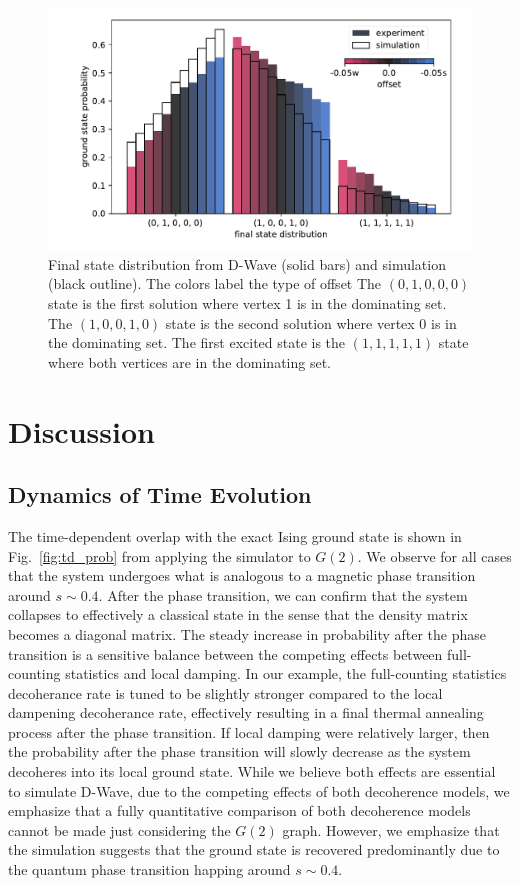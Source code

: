 \documentclass[10pt]{iopart}
\begin{document}
\begin{figure}
	\centering
	\includegraphics[width=\columnwidth]{./new_figures/final_state_distribution.pdf}
	\caption{Final state distribution from D-Wave (solid bars) and simulation (black outline). The colors label the type of offset  The $(0, 1, 0, 0, 0)$ state is the first solution where vertex 1 is in the dominating set. The $(1, 0, 0, 1, 0)$ state is the second solution where vertex 0 is in the dominating set. The first excited state is the $(1, 1, 1, 1, 1)$ state where both vertices are in the dominating set.}
	\label{fig:final_state_distribution}
\end{figure}


\section{Discussion}
\subsection{Dynamics of Time Evolution}
\label{sec:discussion:time_evolution}

The time-dependent overlap with the exact Ising ground state is shown in Fig.~\ref{fig:td_prob} from applying the simulator to $G(2)$. We observe for all cases that the system undergoes what is analogous to a magnetic phase transition around $s\sim 0.4$.
After the phase transition, we can confirm that the system collapses to effectively a classical state in the sense that the density matrix becomes a diagonal matrix.
The steady increase in probability after the phase transition is a sensitive balance between the competing effects between full-counting statistics and local damping.
In our example, the full-counting statistics decoherance rate is tuned to be slightly stronger compared to the local dampening decoherance rate, effectively resulting in a final thermal annealing process after the phase transition.
If local damping were relatively larger, then the probability after the phase transition will slowly decrease as the system decoheres into its local ground state.
While we believe both effects are essential to simulate D-Wave, due to the competing effects of both decoherence models, we emphasize that a fully quantitative comparison of both decoherence models cannot be made just considering the $G(2)$ graph.
However, we emphasize that the simulation suggests that the ground state is recovered predominantly due to the quantum phase transition happing around $s\sim 0.4$.
\end{document}
